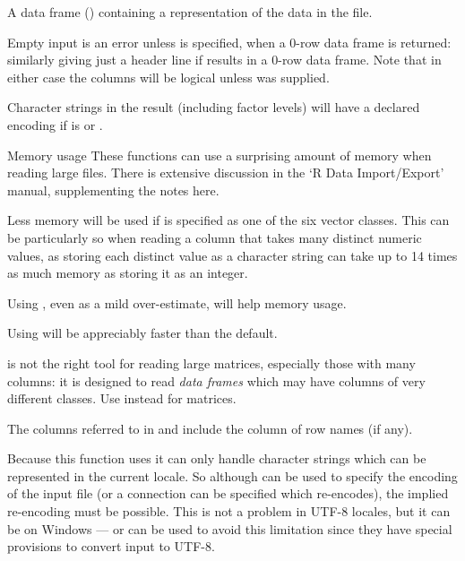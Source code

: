 %
\begin{Value}
A data frame () containing a representation of
the data in the file.

Empty input is an error unless  is specified, when a
0-row data frame is returned: similarly giving just a header line if
 results in a 0-row data frame.  Note that in
either case the columns will be logical unless  was
supplied.

Character strings in the result (including factor levels) will have a
declared encoding if  is  or
.
\end{Value}
%
\begin{Section}{Memory usage}
These functions can use a surprising amount of memory when reading
large files.  There is extensive discussion in the `R Data
Import/Export' manual, supplementing the notes here.

Less memory will be used if  is specified as one of
the six  vector classes.  This can be particularly so when
reading a column that takes many distinct numeric values, as storing
each distinct value as a character string can take up to 14 times as
much memory as storing it as an integer.

Using , even as a mild over-estimate, will help memory
usage.

Using  will be appreciably faster than the
 default.

 is not the right tool for reading large matrices,
especially those with many columns: it is designed to read
\emph{data frames} which may have columns of very different classes.
Use  instead for matrices.
\end{Section}
%
\begin{Note}\relax
The columns referred to in  and  include
the column of row names (if any).

Because this function uses  it can only handle
character strings which can be represented in the current locale.  So
although  can be used to specify the encoding of
the input file (or a connection can be specified which re-encodes),
the implied re-encoding must be possible.  This is not a problem in
UTF-8 locales, but it can be on Windows ---  or
 can be used to avoid this limitation since they have
special provisions to convert input to UTF-8.
\end{Note}
